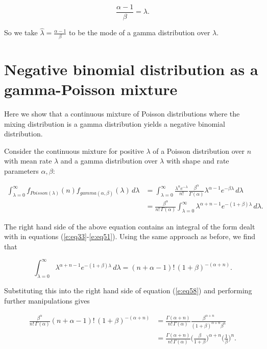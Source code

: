 \documentclass[12pt]{article}
\begin{document}
\begin{equation}
\frac{\alpha - 1}{\beta} = \lambda.
\end{equation}

So we take $\hat\lambda = \frac{\alpha - 1}{\beta}$ to be the mode of a gamma distribution over $\lambda$.

\section{Negative binomial distribution as a gamma-Poisson mixture}
\label{a:mixture_derivation}
Here we show that a continuous mixture of Poisson distributions where the mixing distribution is a gamma distribution yields a negative binomial distribution.

Consider the continuous mixture for positive $\lambda$ of a Poisson distribution over $n$ with mean rate $\lambda$ and a gamma distribution over $\lambda$ with shape and rate parameters $\alpha,\beta$:

\begin{align}
\int_{\lambda = 0}^{\infty} f_{Poisson(\lambda)}(n) f_{gamma(\alpha,\beta)}(\lambda) \, d\lambda &= \int_{\lambda = 0}^{\infty} \frac{\lambda^n e^{-\lambda}}{n!} \frac{\beta^{\alpha}}{\Gamma(\alpha)} \lambda^{\alpha - 1} e^{-\beta\lambda} \, d\lambda \\[5pt]
&= \frac{\beta^{\alpha}}{n!\,\Gamma(\alpha)} \int_{\lambda = 0}^{\infty} \lambda^{\alpha + n - 1} e^{-(1 + \beta)\lambda} \, d\lambda.
\label{e:eq58}
\end{align}

The right hand side of the above equation contains an integral of the form dealt with in equations (\ref{e:eq33}-\ref{e:eq51}). Using the same approach as before, we find that

\begin{equation}
\int_{\lambda = 0}^{\infty} \lambda^{\alpha + n - 1} e^{-(1 + \beta)\lambda} \, d\lambda = (n + \alpha - 1)!\,(1 + \beta)^{-(\alpha + n)}.
\end{equation}

Substituting this into the right hand side of equation (\ref{e:eq58}) and performing further manipulations gives

\begin{align}
\frac{\beta^{\alpha}}{n!\,\Gamma(\alpha)} (n + \alpha - 1)!\,(1 + \beta)^{-(\alpha + n)} &= \frac{\Gamma(\alpha + n)}{n!\,\Gamma(\alpha)} \frac{\beta^{\alpha + n}}{(1 + \beta)^{\alpha + n} \beta^n} \\[5pt]
&= \frac{\Gamma(\alpha + n)}{n!\,\Gamma(\alpha)} \Big(\frac{\beta}{1 + \beta}\Big)^{\alpha + n} \Big(\frac{1}{\beta}\Big)^n.
\label{e:eq61}
\end{align}
\end{document}
